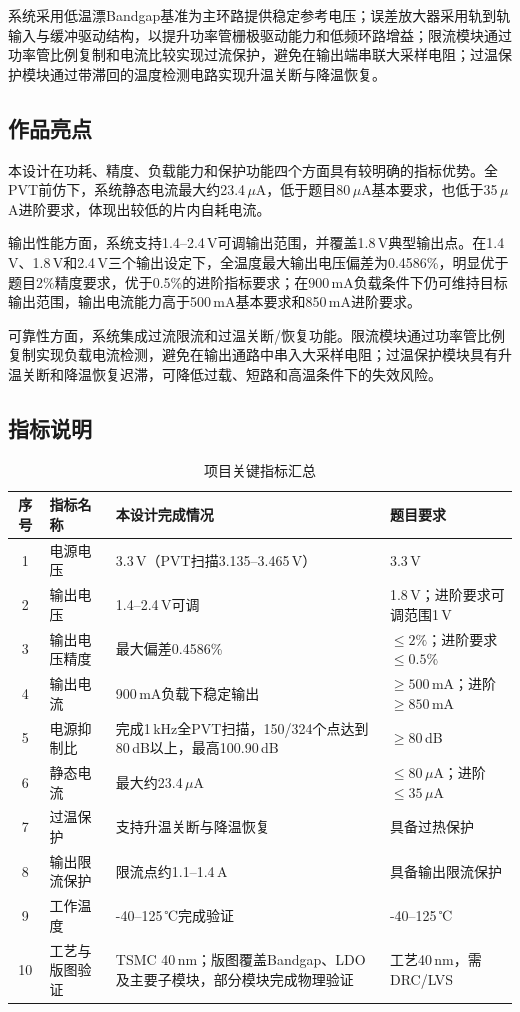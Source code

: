 \documentclass[a4paper, 12pt]{article}
\begin{document}
系统采用低温漂Bandgap基准为主环路提供稳定参考电压；误差放大器采用轨到轨输入与缓冲驱动结构，以提升功率管栅极驱动能力和低频环路增益；限流模块通过功率管比例复制和电流比较实现过流保护，避免在输出端串联大采样电阻；过温保护模块通过带滞回的温度检测电路实现升温关断与降温恢复。

\subsection{作品亮点}

本设计在功耗、精度、负载能力和保护功能四个方面具有较明确的指标优势。全PVT前仿下，系统静态电流最大约23.4\,$\mu$A，低于题目80\,$\mu$A基本要求，也低于35\,$\mu$A进阶要求，体现出较低的片内自耗电流。

输出性能方面，系统支持1.4--2.4\,V可调输出范围，并覆盖1.8\,V典型输出点。在1.4\,V、1.8\,V和2.4\,V三个输出设定下，全温度最大输出电压偏差为0.4586\%，明显优于题目2\%精度要求，优于0.5\%的进阶指标要求；在900\,mA负载条件下仍可维持目标输出范围，输出电流能力高于500\,mA基本要求和850\,mA进阶要求。

可靠性方面，系统集成过流限流和过温关断/恢复功能。限流模块通过功率管比例复制实现负载电流检测，避免在输出通路中串入大采样电阻；过温保护模块具有升温关断和降温恢复迟滞，可降低过载、短路和高温条件下的失效风险。

\subsection{指标说明}
\begin{table}[H]
  \centering
  \small
  \setlength{\tabcolsep}{4pt}
  \begin{tabularx}{\textwidth}{clXX}
    \toprule
    序号 & 指标名称 & 本设计完成情况 & 题目要求 \\
    \midrule
    1 & 电源电压 & 3.3\,V（PVT扫描3.135--3.465\,V） & 3.3\,V \\
    2 & 输出电压 & 1.4--2.4\,V可调 & 1.8\,V；进阶要求可调范围1\,V \\
    3 & 输出电压精度 & 最大偏差0.4586\% & $\leq 2\%$；进阶要求$\leq 0.5\%$ \\
    4 & 输出电流 & 900\,mA负载下稳定输出 & $\geq 500$\,mA；进阶$\geq 850$\,mA \\
    5 & 电源抑制比 & 完成1\,kHz全PVT扫描，150/324个点达到80\,dB以上，最高100.90\,dB & $\geq 80$\,dB \\
    6 & 静态电流 & 最大约23.4\,$\mu$A & $\leq 80\,\mu$A；进阶$\leq 35\,\mu$A \\
    7 & 过温保护 & 支持升温关断与降温恢复 & 具备过热保护 \\
    8 & 输出限流保护 & 限流点约1.1--1.4\,A & 具备输出限流保护 \\
    9 & 工作温度 & -40--125\,℃完成验证 & -40--125\,℃ \\
    10 & 工艺与版图验证 & TSMC 40\,nm；版图覆盖Bandgap、LDO及主要子模块，部分模块完成物理验证 & 工艺40\,nm，需DRC/LVS \\
    \bottomrule
  \end{tabularx}
  \caption{项目关键指标汇总}
  \label{tab:spec-summary}
\end{table}
\end{document}
